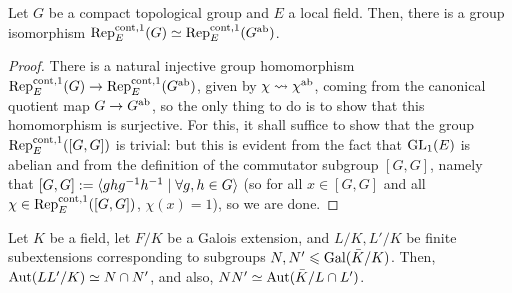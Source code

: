             \begin{lemma} \label{lemma: abelianising_continuous_characters}
                Let $G$ be a compact topological group and $E$ a local field. Then, there is a group isomorphism $\mathrm{Rep}^{\mathrm{cont}, 1}_E(G) \simeq \mathrm{Rep}^{\mathrm{cont}, 1}_E(G^{\mathrm{ab}})$.
            \end{lemma}
                \begin{proof}
                    There is a natural injective group homomorphism $\mathrm{Rep}^{\mathrm{cont}, 1}_E(G) \to \mathrm{Rep}^{\mathrm{cont}, 1}_E(G^{\mathrm{ab}})$, given by $\chi \leadsto \chi^{\mathrm{ab}}$, coming from the canonical quotient map $G \to G^{\mathrm{ab}}$, so the only thing to do is to show that this homomorphism is surjective. For this, it shall suffice to show that the group $\mathrm{Rep}^{\mathrm{cont}, 1}_E([G, G])$ is trivial: but this is evident from the fact that $\operatorname{GL}_1(E)$ is abelian and from the definition of the commutator subgroup $[G, G]$, namely that $[G, G] := \langle ghg^{-1}h^{-1} \mid \forall g, h \in G\rangle$ (so for all $x \in [G, G]$ and all $\chi \in \mathrm{Rep}^{\mathrm{cont}, 1}_E([G, G])$, $\chi(x) = 1$), so we are done.
                \end{proof}
            \begin{lemma} \label{lemma: galois_groups_of_composite_fields}
                \cite[Theorem 5.13]{keith_conrad_galois_correspondence} Let $K$ be a field, let $F/K$ be a Galois extension, and $L/K, L'/K$ be finite subextensions corresponding to subgroups $N, N' \leqslant \mathrm{Gal}(\bar{K}/K)$. Then, $\mathrm{Aut}(LL'/K) \simeq N \cap N'$, and also, $NN' \simeq \mathrm{Aut}(\bar{K}/L \cap L')$.
            \end{lemma}
